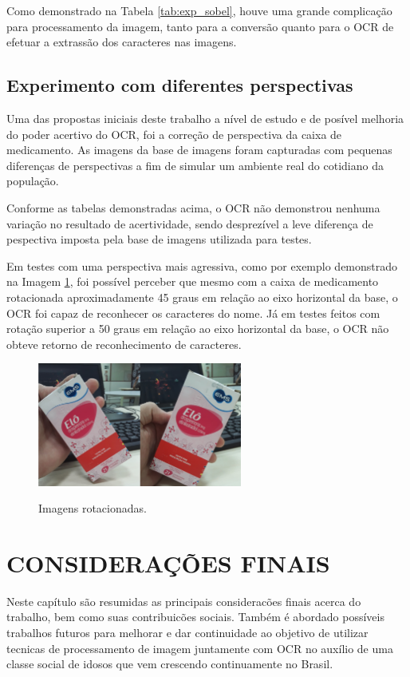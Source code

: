 Como demonstrado na Tabela \ref{tab:exp_sobel}, houve uma grande complicação para processamento da imagem, tanto para a conversão quanto para o OCR de efetuar a extrassão dos caracteres nas imagens.

\section{Experimento com diferentes perspectivas}
Uma das propostas iniciais deste trabalho a nível de estudo e de posível melhoria do poder acertivo do OCR, foi a correção de perspectiva da caixa de medicamento. As imagens da base de imagens foram capturadas com pequenas diferenças de perspectivas a fim de simular um ambiente real do cotidiano da população. 

Conforme as tabelas demonstradas acima, o OCR não demonstrou nenhuma variação no resultado de acertividade, sendo desprezível a leve diferença de pespectiva imposta pela base de imagens utilizada para testes.

Em testes com uma perspectiva mais agressiva, como por exemplo demonstrado na Imagem \ref{fig:rotacionadas}, foi possível perceber que mesmo com a caixa de medicamento rotacionada aproximadamente 45 graus em relação ao eixo horizontal da base, o OCR foi capaz de reconhecer os caracteres do nome. Já em testes feitos com rotação superior a 50 graus em relação ao eixo horizontal da base, o OCR não obteve retorno de reconhecimento de caracteres.


 \begin{figure}[h]
	\centering
	\includegraphics[width=0.6\textwidth]{Imagens/perspectiva2.jpg} %
	\caption[Imagens rotacionadas.]{Imagens rotacionadas.}
	\label{fig:rotacionadas}
\end{figure}

\chapter{CONSIDERAÇÕES FINAIS}\label{ch:intro}
Neste capítulo são resumidas as principais consideracões finais acerca do trabalho, bem como suas contribuicões sociais. Também é abordado possíveis trabalhos futuros para melhorar e dar continuidade ao objetivo de utilizar tecnicas de processamento de imagem juntamente com OCR no auxílio de uma classe social de idosos que vem crescendo continuamente no Brasil.


